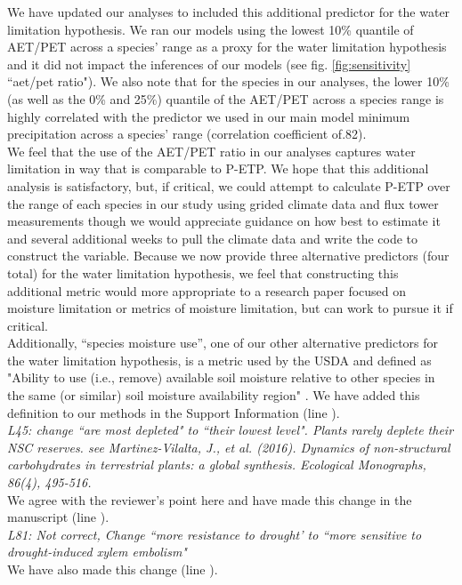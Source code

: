 \documentclass{article}[11pt]
\begin{document}
We have updated our analyses to included this additional predictor for the water limitation hypothesis. We ran our models using the lowest 10\% quantile of AET/PET across a species' range as a proxy for the water limitation hypothesis and it did not impact the inferences of our models (see fig. \ref{fig:sensitivity} ``aet/pet ratio"). We also note that for the species in our analyses, the lower 10\% (as well as the 0\% and 25\%) quantile of the AET/PET across a species range is highly correlated with the predictor we used in our main model minimum precipitation across a species' range (correlation coefficient of.82).\\

We feel that the use of the AET/PET ratio in our analyses captures water limitation in way that is comparable to P-ETP. We hope that this additional analysis is satisfactory, but, if critical, we could attempt to calculate P-ETP over the range of each species in our study using grided climate data and flux tower measurements though we would appreciate guidance on how best to estimate it and several additional weeks to pull the climate data and write the code to construct the variable. Because we now provide three alternative predictors  (four total) for the water limitation hypothesis, we feel that constructing this additional metric would  more appropriate to a research paper focused on moisture limitation or metrics of moisture limitation, but can work to pursue it if critical.\\

Additionally, ``species moisture use'', one of our other alternative predictors for the water limitation hypothesis, is a metric used by the USDA and defined as "Ability to use (i.e., remove) available soil moisture relative to other species in the same (or similar) soil moisture availability region" \citep{usdancrs}. We have added this definition to our methods in the Support Information (line ).\\

\textit{L45: change ``are most depleted" to ``their lowest level". Plants rarely deplete their NSC reserves. see Martinez-Vilalta, J., et al. (2016). Dynamics of non-structural carbohydrates in terrestrial plants: a global synthesis. Ecological Monographs, 86(4), 495-516.}\\

We agree with the reviewer's point here and have made this change in the manuscript (line ).\\


\textit{L81: Not correct, Change ``more resistance to drought' to ``more sensitive to drought-induced xylem embolism"}\\

We have also made this change (line ).


\end{document}
